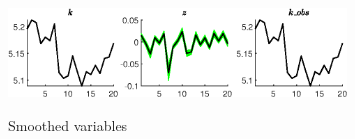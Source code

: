  
\begin{figure}[H]
\centering 
\includegraphics[width=0.80\textwidth]{RBC_kz/Output/RBC_kz_SmoothedVariables_k_obs}
\label{Fig:SmoothedVariables:k_obs}
\caption{Smoothed variables}
\end{figure}
 
